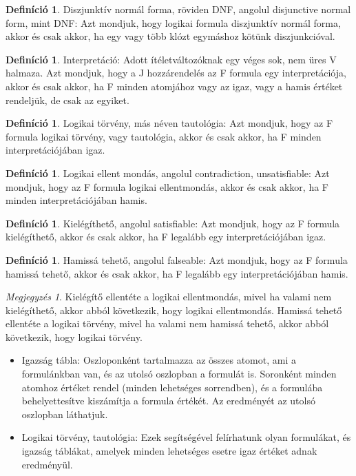 \documentclass[
]{thesis-ekf}
\theoremstyle{definition}
\newtheorem{definicio}[tetel]{Definíció}
\theoremstyle{remark}
\newtheorem{megjegyzes}[tetel]{Megjegyzés}
\begin{document}
	\begin{definicio}
		Diszjunktív normál forma, röviden DNF, angolul disjunctive normal form, mint DNF: Azt mondjuk, hogy logikai formula diszjunktív normál forma, akkor és csak akkor, ha egy vagy több klózt egymáshoz kötünk diszjunkcióval.
	\end{definicio}
	\begin{definicio}
		Interpretáció: Adott ítéletváltozóknak egy véges sok, nem üres V halmaza.
		Azt mondjuk, hogy a J hozzárendelés az F formula egy interpretációja, akkor és csak akkor, ha F minden atomjához vagy az igaz, vagy a hamis értéket rendeljük, de csak az egyiket.
	\end{definicio}
	\begin{definicio}
		Logikai törvény, más néven tautológia: Azt mondjuk, hogy az F formula logikai törvény, vagy tautológia, akkor és csak akkor, ha F minden interpretációjában igaz.
	\end{definicio}
	\begin{definicio}
		Logikai ellent mondás, angolul contradiction, unsatisfiable: Azt mondjuk, hogy az F formula logikai ellentmondás, akkor és csak akkor, ha F minden interpretációjában hamis.
	\end{definicio}
	\begin{definicio}
		Kielégíthető, angolul satisfiable: Azt mondjuk, hogy az F formula kielégíthető, akkor és csak akkor, ha F legalább egy interpretációjában igaz.
	\end{definicio}
	\begin{definicio}
		Hamissá tehető, angolul falseable: Azt mondjuk, hogy az F formula hamissá tehető, akkor és csak akkor, ha F legalább egy interpretációjában hamis. 
	\end{definicio}
	\begin{megjegyzes}
		Kielégítő ellentéte a logikai ellentmondás, mivel ha valami nem kielégíthető, akkor abból következik, hogy logikai ellentmondás.
		Hamissá tehető ellentéte a logikai törvény, mivel ha valami nem hamissá tehető, akkor abból következik, hogy logikai törvény.
	\end{megjegyzes}


	\begin{itemize}	
		\item Igazság tábla: Oszloponként tartalmazza az összes atomot, ami a formulánkban van, és az utolsó oszlopban a formulát is. Soronként minden atomhoz értéket rendel (minden lehetséges sorrendben), és a formulába behelyettesítve kiszámítja a formula értékét. Az eredményét az utolsó oszlopban láthatjuk.
		\item Logikai törvény, tautológia: Ezek segítségével felírhatunk olyan formulákat, és igazság táblákat, amelyek minden lehetséges esetre igaz értéket adnak eredményül.
	\end{itemize}
\end{document}
